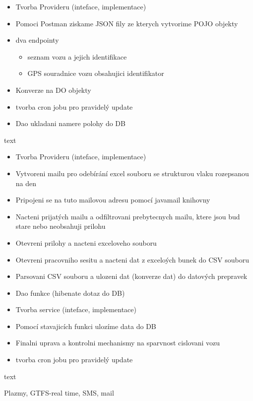 \begin{itemize}
	\item Tvorba Provideru (inteface, implementace)
	\item Pomoci Postman ziskame JSON fily ze kterych vytvorime POJO objekty
	\item dva endpointy
	\begin{itemize}
		\item seznam vozu a jejich identifikace
		\item GPS souradnice vozu obsahujici identifikator
	\end{itemize}
	\item Konverze na DO objekty
	\item tvorba cron jobu pro pravidelý update
	\item Dao ukladani namere polohy do DB
\end{itemize}

text

\begin{itemize}
	\item Tvorba Provideru (inteface, implementace)
	\item Vytvoreni mailu pro odebírání excel souboru se strukturou vlaku rozepsanou na den
	\item Pripojeni se na tuto mailovou adresu pomocí javamail knihovny
	\item Nacteni prijatých mailu a odfiltrovani prebytecnych mailu, ktere jsou bud stare nebo neobsahuji prilohu
	\item Otevreni prilohy a nacteni exceloveho souboru
	\item Otevreni pracovniho sesitu a nacteni dat z exceloých bunek do CSV souboru
	\item Parsovani CSV souboru a ulozeni dat (konverze dat) do datových prepravek
	\item Dao funkce (hibenate dotaz do DB)
	\item Tvorba service (inteface, implementace)
	\item Pomocí stavajicích funkci ulozíme data do DB
	\item Finalni uprava a kontrolni mechanismy na sparvnost cislovani vozu
	\item tvorba cron jobu pro pravidelý update
\end{itemize}

text

Plazmy, GTFS-real time, SMS, mail

